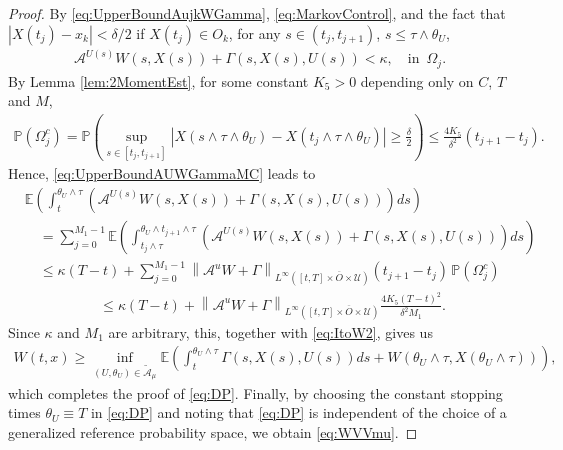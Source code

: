 \documentclass[amscd,amssymb,11pt]{article}
\numberwithin{theorem}{section}
\numberwithin{equation}{section}
\begin{document}
\begin{proof}
By \eqref{eq:UpperBoundAujkWGamma}, \eqref{eq:MarkovControl}, and the fact that $|X(t_{j})-x_{k}|<\delta/2$ if $ X(t_{j})\in O_{k}$, for any $s\in (t_{j},t_{j+1})$, $s\leq\tau\wedge\theta_{U}$,
\begin{align}\label{eq:UpperBoundAUWGammaMC}
\mathscr{A}^{U(s)}W\left(s,X(s)\right)+\Gamma\left(s,X(s),U(s)\right)<\kappa,\quad\text{in }\,\Omega_{j}.
\end{align}
By Lemma \ref{lem:2MomentEst}, for some constant $K_{5}>0$ depending only on $C$, $T$ and $M$,
\begin{align*}
\mathbb{P}(\Omega_{j}^{c})=\mathbb{P}\left(\sup_{s\in [t_{j},t_{j+1}]}\left|X(s\wedge\tau\wedge\theta_{U})-X(t_{j}\wedge\tau\wedge\theta_{U})\right|\geq\frac{\delta}{2}\right)\leq\frac{4K_{5}}{\delta^{2}}\left(t_{j+1}-t_{j}\right).
\end{align*}
Hence, \eqref{eq:UpperBoundAUWGammaMC} leads to
\begin{align*}
&\mathbb{E}\left(\int_{t}^{\theta_{U}\wedge\tau}\left(\mathscr{A}^{U(s)}W(s,X(s))+\Gamma\left(s,X(s),U(s)\right)\right)ds\right)\\
&\quad =\sum_{j=0}^{M_{1}-1}\mathbb{E}\left(\int_{t_{j}\wedge\tau}^{\theta_{U}\wedge t_{j+1}\wedge\tau}\left(\mathscr{A}^{U(s)}W(s,X(s))+\Gamma\left(s,X(s),U(s)\right)\right)ds\right)\\
&\quad\leq\kappa(T-t)+\sum_{j=0}^{M_{1}-1}\left\|\mathscr{A}^{u}W+\Gamma\right\|_{L^{\infty}([t,T]\times\overline{O}\times\mathcal{U})}(t_{j+1}-t_{j})\,\mathbb{P}(\Omega_{j}^{c})
\end{align*}
\begin{align*}
&\quad\leq\kappa(T-t)+\left\|\mathscr{A}^{u}W+\Gamma\right\|_{L^{\infty}([t,T]\times\overline{O}\times\mathcal{U})}\frac{4 K_{5}(T-t)^2}{\delta^{2}M_{1}}.
\end{align*}
Since $\kappa$ and $M_{1}$ are arbitrary, this, together with \eqref{eq:ItoW2}, gives us
\begin{align*}
W(t,x)\geq\inf_{(U,\theta_{U})\in\widetilde{\mathcal{A}}_{\mu}}\mathbb{E}\left(\int_{t}^{\theta_{U}\wedge\tau}\Gamma\left(s,X(s),U(s)\right)ds+W\left(\theta_{U}\wedge\tau,X(\theta_{U}\wedge\tau)\right)\right),
\end{align*}
which completes the proof of \eqref{eq:DP}. Finally, by choosing the constant stopping times $\theta_{U}\equiv T$ in \eqref{eq:DP} and noting that \eqref{eq:DP} is independent of the choice of a generalized reference probability space, we obtain \eqref{eq:WVVmu}.
\end{proof}
\end{document}
